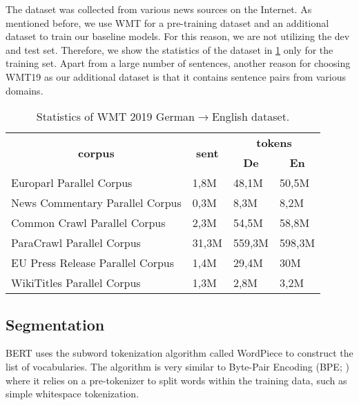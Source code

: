 The dataset was collected from various news sources on the Internet. As mentioned before, we use WMT for a pre-training dataset and an additional dataset to train our baseline models. For this reason, we are not utilizing the dev and test set. Therefore, we show the statistics of the dataset in \cref{tab:wmt19stat} only for the training set. Apart from a large number of sentences, another reason for choosing WMT19 as our additional dataset is that it contains sentence pairs from various domains.

\begin{table}[h]
    \centering
    \begin{tabular}{@{}llll@{}}
        \toprule
        \multicolumn{1}{c}{\multirow{2}{*}{\textbf{corpus}}} &
        \multicolumn{1}{c}{\multirow{2}{*}{\textbf{sent}}}   &
        \multicolumn{2}{c}{\textbf{tokens}}                                            \\
        \multicolumn{1}{c}{}                                 &
        \multicolumn{1}{c}{}                                 &
        \multicolumn{1}{c}{\textbf{De}}                      &
        \multicolumn{1}{c}{\textbf{En}}                                                \\ \midrule
        Europarl Parallel Corpus                             & 1,8M  & 48,1M  & 50,5M  \\
        News Commentary Parallel Corpus                      & 0,3M  & 8,3M   & 8,2M   \\
        Common Crawl Parallel Corpus                         & 2,3M  & 54,5M  & 58,8M  \\
        ParaCrawl Parallel Corpus                            & 31,3M & 559,3M & 598,3M \\
        EU Press Release Parallel Corpus                     & 1,4M  & 29,4M  & 30M    \\
        WikiTitles Parallel Corpus                           & 1,3M  & 2,8M   & 3,2M   \\ \bottomrule
    \end{tabular}
    \caption{Statistics of WMT 2019 German$\rightarrow$English dataset.}
    \label{tab:wmt19stat}
\end{table}

\subsection{Segmentation}
BERT uses the subword tokenization algorithm called WordPiece \cite{schuster2012japanese} to construct the list of vocabularies. The algorithm is very similar to Byte-Pair Encoding (BPE; \cite{sennrich-etal-2016-neural}) where it relies on a pre-tokenizer to split words within the training data, such as simple whitespace tokenization.

